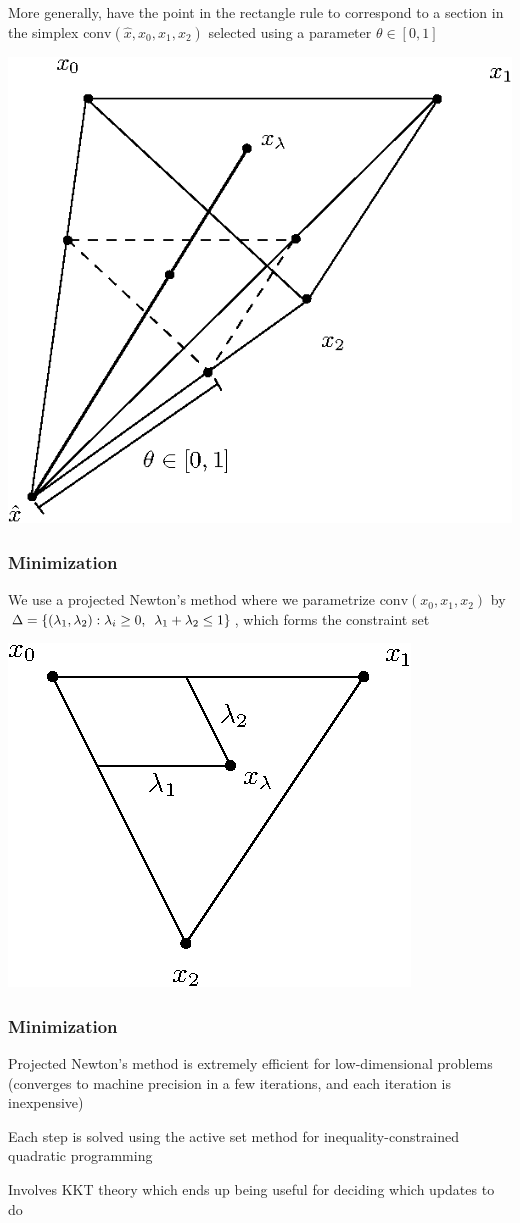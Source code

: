 \documentclass{beamer}
\newcommand{\set}[1]{\left\{#1\right\}}
\begin{document}
\begin{frame}
  More generally, have the point in the rectangle rule to correspond
  to a section in the simplex $\mbox{conv}(\hat{x}, x_0, x_1, x_2)$
  selected using a parameter $\theta \in [0, 1]$
  
  \begin{center}
    \includegraphics[width=0.6\linewidth]{theta-rule.eps}
  \end{center}
\end{frame}

\begin{frame}
  \frametitle{Minimization}

  We use a projected Newton's method where we parametrize
  $\mbox{conv}(x_0, x_1, x_2)$ by
  $\Delta = \set{(\lambda_1, \lambda_2) : \lambda_i \geq 0,
    \hspace{0.5em} \lambda_1 + \lambda_2 \leq 1}$, which forms the
  constraint set

  \begin{center}
    \includegraphics[width=0.5\linewidth]{lambda-coords.eps}
  \end{center}
\end{frame}

\begin{frame}
  \frametitle{Minimization}
  
  Projected Newton's method is extremely efficient for low-dimensional
  problems (converges to machine precision in a few iterations, and
  each iteration is inexpensive)

  \vspace{1em}

  Each step is solved using the active set method for
  inequality-constrained quadratic programming

  \vspace{1em}

  Involves KKT theory which ends up being useful for deciding which
  updates to do
\end{frame}
\end{document}
